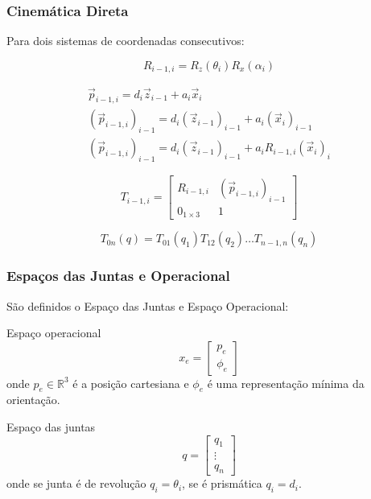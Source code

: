 \documentclass{beamer}
\newcommand\m[1]{\begin{bmatrix}#1\end{bmatrix}}
\begin{document}
\begin{frame}
\frametitle{Cinemática Direta}

Para dois sistemas de coordenadas consecutivos:

\begin{equation}
{R}_{i-1,i} = {R}_z(\theta_i){R}_x(\alpha_i)
\end{equation}

\begin{gather}
{\vec{p}}_{i-1,i} = d_i {\vec{z}}_{i-1} + a_i {\vec{x}}_i \\
({\vec{p}}_{i-1,i})_{i-1} = d_i ({\vec{z}}_{i-1})_{i-1} + a_i ({\vec{x}}_i)_{i-1} \\
({\vec{p}}_{i-1,i})_{i-1} = d_i ({\vec{z}}_{i-1})_{i-1} + a_i {R}_{i-1,i}({\vec{x}}_i)_{i} 
\end{gather}

\begin{equation}
T_{i-1,i} = \m{
    R_{i-1,i}       &  ({\vec{p}}_{i-1,i})_{i-1} \\
    0_{1 \times 3}  &                             1
}
\end{equation}

\begin{equation} \label{eq:cinedireta}
{T}_{0n}({q}) = {T}_{01}(q_1) {T}_{12}(q_{2}) {\dots} {T}_{n-1,n}(q_n)
\end{equation}

\end{frame}

\begin{frame}
\frametitle{Espaços das Juntas e Operacional}
São definidos o Espaço das Juntas e Espaço Operacional:

\begin{block}{Espaço operacional}
\begin{equation} \label{eq:op_space}
{x}_e = \m{ {p}_e \\ {\phi}_e}
\end{equation}
onde ${p}_e \in \mathbb{R}^3$ é a posição cartesiana e ${\phi}_e$ é uma representação mínima da orientação.
\end{block}

\begin{block}{Espaço das juntas}
\begin{equation} \label{eq:joint_space}
{q} = \m{q_1 \\ \vdots \\ q_n}
\end{equation} 
onde se junta é de revolução $q_i = \theta_i$, se é prismática $q_i = d_i$.
\end{block}
\end{frame}
\end{document}

